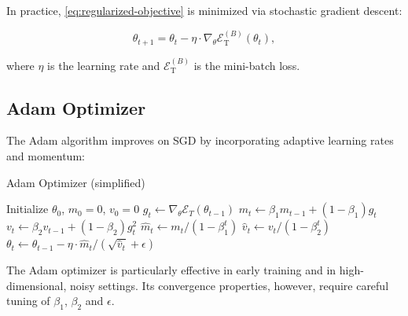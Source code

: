 In practice, \eqref{eq:regularized-objective} is minimized via stochastic
gradient descent:

 \begin{equation*}
\theta_{t+1} = \theta_t - \eta \cdot \nabla_\theta \mathcal{E}_\mathrm{T}^{(B)}(\theta_t),
 \end{equation*}

where $\eta$ is the learning rate and $\mathcal{E}_\mathrm{T}^{(B)}$ is the
mini-batch loss.

\subsection{Adam Optimizer}

The Adam algorithm improves on SGD by incorporating adaptive learning rates and
momentum:

\begin{algorithm}[H]
\caption{Adam Optimizer (simplified)}
\begin{algorithmic}[1]
\State Initialize $\theta_0$, $m_0 = 0$, $v_0 = 0$  \State
$g_t \gets \nabla_\theta \mathcal{E}_T(\theta_{t-1})$ \State $m_t \gets \beta_1
m_{t-1} + (1 - \beta_1) g_t$ \State $v_t \gets \beta_2 v_{t-1} + (1 - \beta_2)
g_t^2$ \State $\hat{m}_t \gets m_t / (1 - \beta_1^t)$ \State $\hat{v}_t \gets
v_t / (1 - \beta_2^t)$ \State $\theta_t \gets \theta_{t-1} - \eta \cdot
\hat{m}_t / (\sqrt{\hat{v}_t} + \epsilon)$ \EndFor
\end{algorithmic}
\end{algorithm}

\begin{remark}
The Adam optimizer is particularly effective in early training and in
high-dimensional, noisy settings. Its convergence properties, however, require
careful tuning of $\beta_1$, $\beta_2$ and $\epsilon$.
\end{remark}




































